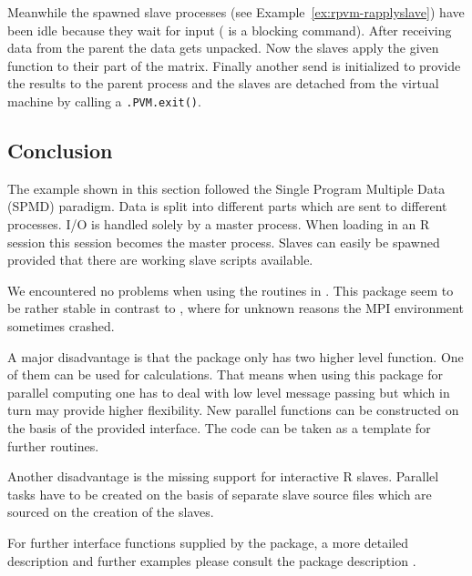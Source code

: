 Meanwhile the spawned slave processes (see
Example~\ref{ex:rpvm-rapplyslave}) have been idle because they wait
for input ( is a blocking command). After
receiving data from the parent the data gets unpacked. Now the slaves
apply the given function to their part of the matrix. Finally another
send is initialized to provide the results to the parent process and
the slaves are detached from the virtual machine by calling a
\texttt{.PVM.exit()}. 

\subsection{Conclusion}

The  example shown in this section followed the
Single Program Multiple Data (SPMD) paradigm. Data is split into
different parts which are sent to different processes. I/O is handled
solely by a master
process. When loading  in an R session this session becomes the
master process. Slaves can easily be spawned provided that there are
working slave scripts available.

We encountered no problems when using the routines in . This
package seem to be rather stable in contrast to , where for
unknown reasons the MPI environment sometimes crashed.

A major disadvantage is that the 
package only has two higher level function. One of them can be used
for calculations. That means when using this package for parallel
computing one has 
to deal with low level message passing but which in turn may provide
higher flexibility. New parallel functions can be constructed on the
basis of the provided interface. The  code
can be taken as a template for further routines. 

Another disadvantage is the missing support for interactive R
slaves. Parallel tasks have to be created on the basis of separate
slave source files which are sourced on the creation of the slaves.

For further interface functions supplied by the  package, a more
detailed 
description and further examples please consult the package description
\cite{nali07rpvm}.
